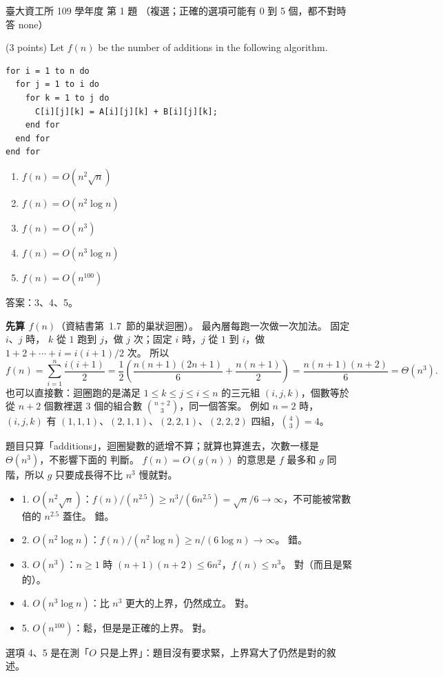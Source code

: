 \begin{pastexam}[label={px:ntu-109-dsaa-01}]{臺大資工所 109 學年度 第 1 題}
（複選；正確的選項可能有 0 到 5 個，都不對時答 none）

(3 points) Let $f(n)$ be the number of additions in the following algorithm.
\begin{verbatim}
for i = 1 to n do
  for j = 1 to i do
    for k = 1 to j do
      C[i][j][k] = A[i][j][k] + B[i][j][k];
    end for
  end for
end for
\end{verbatim}
\begin{enumerate}[label=\arabic*.]
\item $f(n)=O(n^2\sqrt{n})$
\item $f(n)=O(n^2\log n)$
\item $f(n)=O(n^3)$
\item $f(n)=O(n^3\log n)$
\item $f(n)=O(n^{100})$
\end{enumerate}
\end{pastexam}

\begin{pastsoln}
答案：3、4、5。

\textbf{先算 $f(n)$}（資結書第~1.7~節的巢狀迴圈）。 最內層每跑一次做一次加法。 固定 $i$、$j$ 時，
$k$ 從 $1$ 跑到 $j$，做 $j$ 次；固定 $i$ 時，$j$ 從 $1$ 到 $i$，做 $1 + 2 + \cdots + i = i(i+1)/2$ 次。
所以
\[
f(n) = \sum_{i=1}^{n} \frac{i(i+1)}{2} = \frac{1}{2}\left(\frac{n(n+1)(2n+1)}{6} + \frac{n(n+1)}{2}\right)
= \frac{n(n+1)(n+2)}{6} = \Theta(n^3).
\]
也可以直接數：迴圈跑的是滿足 $1 \le k \le j \le i \le n$ 的三元組 $(i, j, k)$，個數等於從 $n + 2$
個數裡選 $3$ 個的組合數 $\binom{n+2}{3}$，同一個答案。 例如 $n = 2$ 時，$(i, j, k)$ 有
$(1,1,1)$、$(2,1,1)$、$(2,2,1)$、$(2,2,2)$ 四組，$\binom{4}{3} = 4$。

題目只算「additions」，迴圈變數的遞增不算；就算也算進去，次數一樣是 $\Theta(n^3)$，不影響下面的
判斷。 $f(n) = O(g(n))$ 的意思是 $f$ 最多和 $g$ 同階，所以 $g$ 只要成長得不比 $n^3$ 慢就對。

\begin{itemize}
\item 1. $O(n^2\sqrt{n})$：$f(n)/(n^{2.5}) \ge n^3/(6n^{2.5}) = \sqrt{n}/6 \to \infty$，不可能被常數
倍的 $n^{2.5}$ 蓋住。 錯。
\item 2. $O(n^2\log n)$：$f(n)/(n^2 \log n) \ge n/(6\log n) \to \infty$。 錯。
\item 3. $O(n^3)$：$n \ge 1$ 時 $(n+1)(n+2) \le 6n^2$，$f(n) \le n^3$。 對（而且是緊的）。
\item 4. $O(n^3\log n)$：比 $n^3$ 更大的上界，仍然成立。 對。
\item 5. $O(n^{100})$：鬆，但是是正確的上界。 對。
\end{itemize}
選項 4、5 是在測「$O$ 只是上界」：題目沒有要求緊，上界寫大了仍然是對的敘述。
\end{pastsoln}
